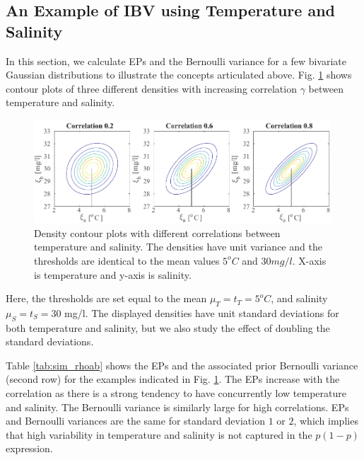 \documentclass[aoas]{imsart}
\begin{document}
\subsection{An Example of IBV using Temperature and Salinity}

In this section, we calculate EPs and the Bernoulli variance for a few bivariate
Gaussian distributions to illustrate the concepts articulated above.
Fig. \ref{illus_bivarDens} shows contour plots of three different
densities with increasing correlation $\gamma$ between temperature and
salinity.
\begin{figure}[h!] \centering
  \includegraphics[width=0.99\textwidth]{Figures/illus_bivar.pdf}
  \caption{Density contour plots with different correlations between
    temperature and salinity. The densities have unit variance and the
    thresholds are identical to the mean values $5^o C$ and
    $30 mg/l$. X-axis is temperature and y-axis is salinity.}
\label{illus_bivarDens}
\end{figure}
Here, the thresholds are set equal to the mean $\mu_T=t_T=5^o C$, and
salinity $\mu_S=t_S=30$ mg/l. The displayed densities have unit
standard deviations for both temperature and salinity, but we also
study the effect of doubling the standard deviations.

Table \ref{tab:sim_rhoab} shows the EPs and the associated prior Bernoulli
variance (second row) for the examples indicated in
Fig. \ref{illus_bivarDens}. The EPs increase with the correlation as
there is a strong tendency to have concurrently low temperature and
salinity. The Bernoulli variance is similarly large for high
correlations. EPs and Bernoulli variances are the same for standard
deviation $1$ or $2$, which implies that high variability in
temperature and salinity is not captured in the $p(1-p)$ expression.
\end{document}
